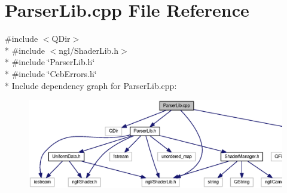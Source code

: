\section{Parser\-Lib.\-cpp File Reference}
\label{_parser_lib_8cpp}
{\ttfamily \#include $<$Q\-Dir$>$}\\*
{\ttfamily \#include $<$ngl/\-Shader\-Lib.\-h$>$}\\*
{\ttfamily \#include \char`\"{}Parser\-Lib.\-h\char`\"{}}\\*
{\ttfamily \#include \char`\"{}Ceb\-Errors.\-h\char`\"{}}\\*
Include dependency graph for Parser\-Lib.\-cpp\-:\nopagebreak
\begin{figure}[H]
\begin{center}
\leavevmode
\includegraphics[width=350pt]{_parser_lib_8cpp__incl}
\end{center}
\end{figure}
